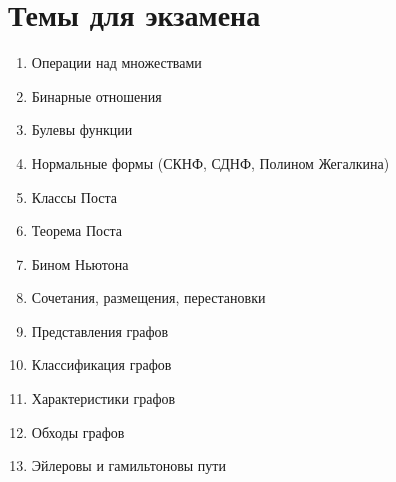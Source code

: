 \documentclass{paper}
\begin{document}
\section{Темы для экзамена}
\begin{enumerate}
    \item Операции над множествами
    \item Бинарные отношения
    \item Булевы функции
    \item Нормальные формы (СКНФ, СДНФ, Полином Жегалкина)
    \item Классы Поста
    \item Теорема Поста
    \item Бином Ньютона
    \item Сочетания, размещения, перестановки
    \item Представления графов
    \item Классификация графов
    \item Характеристики графов
    \item Обходы графов
    \item Эйлеровы и гамильтоновы пути
\end{enumerate}
\end{document}
